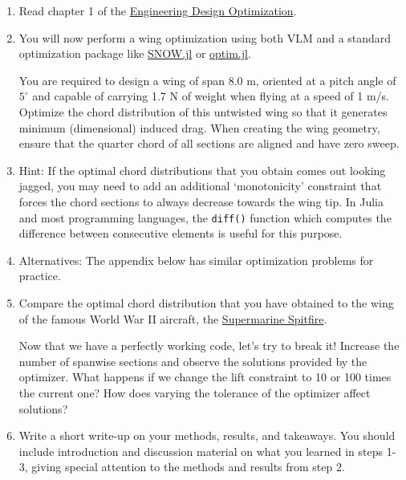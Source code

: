 \documentclass[12pt]{article}
\begin{document}
\begin{enumerate}
	\item Read chapter 1 of the \href{http://flowlab.groups.et.byu.net/mdobook.pdf}{Engineering Design Optimization}. 
	\item You will now perform a wing optimization using both VLM and a standard optimization package like \href{https://github.com/byuflowlab/SNOW.jl}{SNOW.jl} or \href{https://github.com/JuliaNLSolvers/Optim.jl}{optim.jl}.
	
	You are required to design a wing of span 8.0 m, oriented at a pitch angle of $5^\circ$ and capable of carrying 1.7 N of weight when flying at a speed of 1 m/s. Optimize the chord distribution of this untwisted wing so that it generates minimum (dimensional) induced drag. When creating the wing geometry, ensure that the quarter chord of all sections are aligned and have zero sweep.
	
	\item[] Hint: If the optimal chord distributions that you obtain comes out looking jagged, you may need to add an additional `monotonicity' constraint that forces the chord sections to always decrease towards the wing tip. In Julia and most programming languages, the \verb*|diff()| function which computes the difference between consecutive elements is useful for this purpose.
	
	\item[] Alternatives: The appendix below has similar optimization problems for practice.
	
	\item Compare the optimal chord distribution that you have obtained to the wing of the famous World War II aircraft, the \href{https://en.wikipedia.org/wiki/Supermarine_Spitfire}{Supermarine Spitfire}.
	
	Now that we have a perfectly working code, let's try to break it! Increase the number of spanwise sections and observe the solutions provided by the optimizer. What happens if we change the lift constraint to 10 or 100 times the current one? How does varying the tolerance of the optimizer affect solutions?
	
	\item Write a short write-up on your methods, results, and takeaways. You should include introduction and discussion material on what you learned in steps 1-3, giving special attention to the methods and results from step 2.
		

\end{enumerate}
\end{document}
